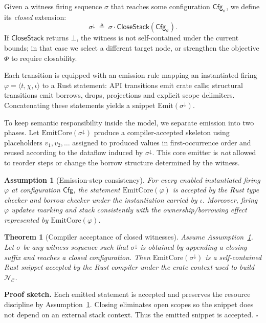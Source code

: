 \documentclass[sigconf]{acmart}
\newtheorem{theorem}{Theorem}
\newtheorem{assumption}{Assumption}
\begin{document}
Given a witness firing sequence $\sigma$ that reaches some configuration $\mathsf{Cfg}_{\sigma}$,
we define its \emph{closed} extension:
\begin{equation*}
    \sigma^{\downarrow}\ \triangleq\ \sigma\cdot \mathsf{CloseStack}(\mathsf{Cfg}_{\sigma}).
\end{equation*}
If $\mathsf{CloseStack}$ returns $\bot$, the witness is not self-contained under the current bounds; in that case we select a different target node, or strengthen the objective $\Phi$ to require closability.

Each transition is equipped with an emission rule mapping an instantiated firing $\varphi=\langle t,\chi,\iota\rangle$ to a Rust statement: API transitions emit crate calls; structural transitions emit borrows, drops, projections and explicit scope delimiters. Concatenating these statements yields a snippet $\mathrm{Emit}(\sigma^{\downarrow})$.

To keep semantic responsibility inside the model, we separate emission into two phases. Let $\mathrm{EmitCore}(\sigma^{\downarrow})$ produce a compiler-accepted skeleton using placeholders $v_1,v_2,\dots$ assigned to produced values in first-occurrence order and reused according to the dataflow induced by $\sigma^{\downarrow}$. This core emitter is \emph{not} allowed to reorder steps or change the borrow structure determined by the witness.

\begin{assumption}[Emission-step consistency]
\label{ass:emit-sound}
For every enabled instantiated firing $\varphi$ at configuration $\mathsf{Cfg}$,
the statement $\mathrm{EmitCore}(\varphi)$ is accepted by the Rust type checker and borrow checker
under the instantiation carried by $\iota$.
Moreover, firing $\varphi$ updates marking and stack consistently with the ownership/borrowing effect
represented by $\mathrm{EmitCore}(\varphi)$.
\end{assumption}

\begin{theorem}[Compiler acceptance of closed witnesses]
\label{thm:compile-closed}
Assume Assumption~\ref{ass:emit-sound}.
Let $\sigma$ be any witness sequence such that $\sigma^{\downarrow}$ is obtained by appending a closing suffix
and reaches a closed configuration.
Then $\mathrm{EmitCore}(\sigma^{\downarrow})$ is a self-contained Rust snippet accepted by the Rust compiler
under the crate context used to build $\mathcal{N}_{\mathcal{C}}$.
\end{theorem}
\noindent\textbf{Proof sketch.}
Each emitted statement is accepted and preserves the resource discipline by Assumption~\ref{ass:emit-sound}.
Closing eliminates open scopes so the snippet does not depend on an external stack context.
Thus the emitted snippet is accepted. \hfill $\square$
\end{document}
